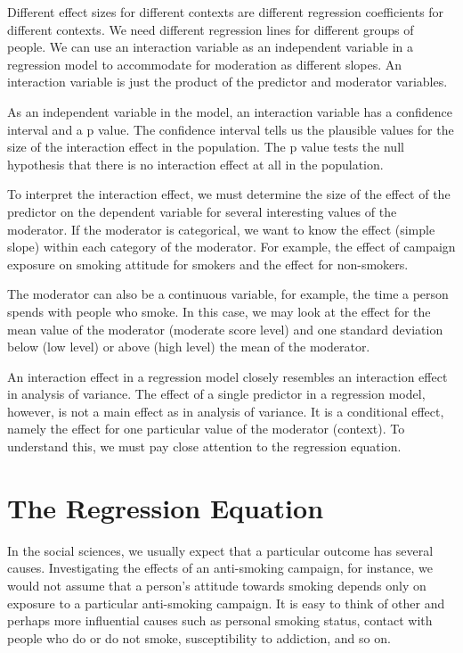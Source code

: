 \documentclass[a4paper]{book}
\theoremstyle{definition}
\theoremstyle{definition}
\theoremstyle{definition}
\theoremstyle{remark}
\begin{document}
Different effect sizes for different contexts are different regression
coefficients for different contexts. We need different regression lines
for different groups of people. We can use an interaction variable as an
independent variable in a regression model to accommodate for moderation
as different slopes. An interaction variable is just the product of the
predictor and moderator variables.

As an independent variable in the model, an interaction variable has a
confidence interval and a p value. The confidence interval tells us the
plausible values for the size of the interaction effect in the
population. The p value tests the null hypothesis that there is no
interaction effect at all in the population.

To interpret the interaction effect, we must determine the size of the
effect of the predictor on the dependent variable for several
interesting values of the moderator. If the moderator is categorical, we
want to know the effect (simple slope) within each category of the
moderator. For example, the effect of campaign exposure on smoking
attitude for smokers and the effect for non-smokers.

The moderator can also be a continuous variable, for example, the time a
person spends with people who smoke. In this case, we may look at the
effect for the mean value of the moderator (moderate score level) and
one standard deviation below (low level) or above (high level) the mean
of the moderator.

An interaction effect in a regression model closely resembles an
interaction effect in analysis of variance. The effect of a single
predictor in a regression model, however, is not a main effect as in
analysis of variance. It is a conditional effect, namely the effect for
one particular value of the moderator (context). To understand this, we
must pay close attention to the regression equation.

\section{The Regression Equation}\label{regression-equation}

In the social sciences, we usually expect that a particular outcome has
several causes. Investigating the effects of an anti-smoking campaign,
for instance, we would not assume that a person's attitude towards
smoking depends only on exposure to a particular anti-smoking campaign.
It is easy to think of other and perhaps more influential causes such as
personal smoking status, contact with people who do or do not smoke,
susceptibility to addiction, and so on.
\end{document}
